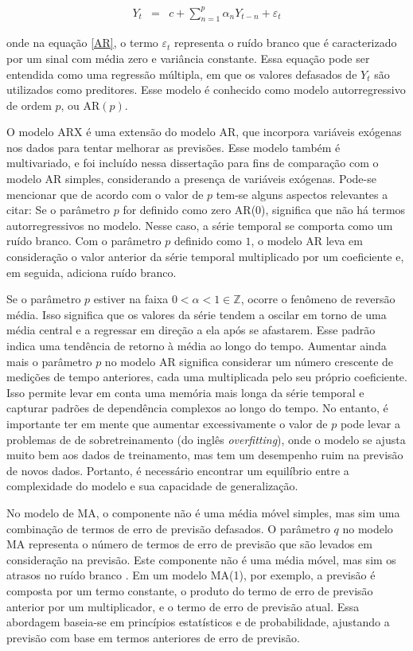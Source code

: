 \begin{eqnarray}
 	Y_t&=&c+\sum_{n=1}^{p} \alpha_n Y_{t-n} + \varepsilon_t\label{AR}
 \end{eqnarray}
 
\noindent onde na equação \eqref{AR}, o termo $\varepsilon_t$ representa o ruído branco que é caracterizado por um sinal com média zero e variância constante. Essa equação pode ser entendida como uma regressão múltipla, em que os valores defasados de $Y_t$ são utilizados como preditores. Esse modelo é conhecido como modelo autorregressivo de ordem $p$, ou AR$(p)$.
 
O modelo ARX é uma extensão do modelo AR, que incorpora variáveis exógenas nos dados para tentar melhorar as previsões. Esse modelo também é multivariado, e foi incluído nessa dissertação para fins de comparação com o modelo AR simples, considerando a presença de variáveis exógenas. Pode-se mencionar que de acordo com o valor de $p$ tem-se alguns aspectos relevantes a citar:
 Se o parâmetro $p$ for definido como zero AR($0$), significa que não há termos autorregressivos no modelo. Nesse caso, a série temporal se comporta como um ruído branco. Com o parâmetro $p$ definido como $1$, o modelo AR leva em consideração o valor anterior da série temporal multiplicado por um coeficiente e, em seguida, adiciona ruído branco. 
 
 Se o parâmetro $p$ estiver na faixa $0 < \alpha < 1 \in \mathbb{Z}$, ocorre o fenômeno de reversão média. Isso significa que os valores da série tendem a oscilar em torno de uma média central e a regressar em direção a ela após se afastarem. Esse padrão indica uma tendência de retorno à média ao longo do tempo. Aumentar ainda mais o parâmetro $p$ no modelo AR significa considerar um número crescente de medições de tempo anteriores, cada uma multiplicada pelo seu próprio coeficiente. Isso permite levar em conta uma memória mais longa da série temporal e capturar padrões de dependência complexos ao longo do tempo. No entanto, é importante ter em mente que aumentar excessivamente o valor de $p$ pode levar a problemas de de sobretreinamento (do inglês \textit{overfitting}), onde o modelo se ajusta muito bem aos dados de treinamento, mas tem um desempenho ruim na previsão de novos dados. Portanto, é necessário encontrar um equilíbrio entre a complexidade do modelo e sua capacidade de generalização.
 
No modelo de MA, o componente não é uma média móvel simples, mas sim uma combinação de termos de erro de previsão defasados. O parâmetro $q$ no modelo MA representa o número de termos de erro de previsão que são levados em consideração na previsão. Este componente não é uma média móvel, mas sim os atrasos no ruído branco \cite{signal}.
Em um modelo MA(1), por exemplo, a previsão é composta por um termo constante, o produto do termo de erro de previsão anterior por um multiplicador, e o termo de erro de previsão atual. Essa abordagem baseia-se em princípios estatísticos e de probabilidade, ajustando a previsão com base em termos anteriores de erro de previsão.
 
